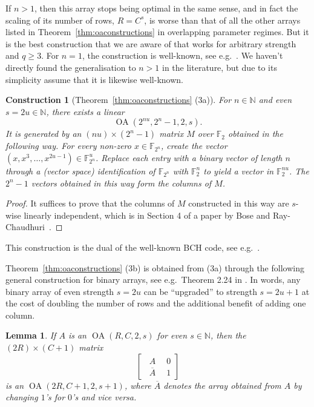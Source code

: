 \documentclass[11pt, letterpaper]{article}
\newtheorem{construction}{Construction}
\newtheorem{lemma}{Lemma}
\theoremstyle{definition}
\theoremstyle{remark}
\DeclareMathOperator{\OA}{OA}
\newcommand{\N}{\mathbb{N}}
\begin{document}
\begin{appendices}
If $n > 1$, then this array stops being optimal in the same sense, and in fact the scaling of its number of rows, $R = C^s$, is worse than that of all the other arrays listed in Theorem~\ref{thm:oaconstructions} in overlapping parameter regimes. But it is the best construction that we are aware of that works for arbitrary strength and $q \ge 3$. For $n=1$, the construction is well-known, see e.g.\ \cite[Corollary 10.7]{stinson2008}. We haven't directly found the generalisation to $n>1$ in the literature, but due to its simplicity assume that it is likewise well-known.

\begin{construction}[Theorem~\ref{thm:oaconstructions} (3a)]
    For $n\in \N$ and even $s=2u\in \N$, there exists a linear \[
    \OA(2^{nu},2^n-1,2,s).
    \] It is generated by an $(nu) \times (2^n-1)$ matrix $M$ over $\mathbb{F}_2$ obtained in the following way. For every non-zero $x\in \mathbb{F}_{2^n}$, create the vector $(x,x^3,\ldots,x^{2u-1}) \in \mathbb{F}_{2^n}^u$. Replace each entry with a binary vector of length $n$ through a (vector space) identification of $\mathbb{F}_{2^n}$ with $\mathbb{F}_2^n$ to yield a vector in $\mathbb{F}_2^{nu}$. The $2^n-1$ vectors obtained in this way form the columns of $M$.
\end{construction}
\begin{proof}
    It suffices to prove that the columns of $M$ constructed in this way are $s$-wise linearly independent, which is in Section 4 of a paper by Bose and Ray-Chaudhuri~\cite{bose-ray1960}.
\end{proof}

This construction is the dual of the well-known BCH code, see e.g.~\cite{BCH}.

Theorem~\ref{thm:oaconstructions} (3b) is obtained from (3a) through the following general construction for binary arrays, see e.g.\ Theorem 2.24 in \cite{hedayat2012}. In words, any binary array of even strength $s=2u$ can be ``upgraded'' to strength $s=2u+1$ at the cost of doubling the number of rows and the additional benefit of adding one column.

\begin{lemma}
    If $A$ is an $\OA(R,C,2,s)$ for even $s\in \N$, then the $(2R) \times (C+1)$ matrix \[
    \left[\begin{array}{c|c}
    \enspace A \enspace & 0\\[5pt]
    \enspace \overline{A} \enspace & 1
    \end{array}\right]
    \] is an $\OA(2R,C+1,2,s+1)$, where $\overline{A}$ denotes the array obtained from $A$ by changing $1$'s for $0$'s and vice versa.
\end{lemma}


\end{appendices}
\end{document}
